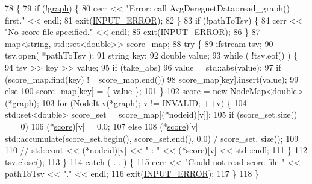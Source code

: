 \begin{DoxyCode}
78                                                               \{
79     \textcolor{keywordflow}{if} (!\hyperlink{classderegnet_1_1DeregnetData_ab76d30fa2ef87099faecb31e3f95b6d6}{graph}) \{
80         cerr << \textcolor{stringliteral}{"Error: call AvgDeregnetData::read\_graph() first."} << endl;
81         exit(\hyperlink{DeregnetData_8h_a288116f92845fddefeb044f5b84bc889}{INPUT\_ERROR});
82     \}
83     \textcolor{keywordflow}{if} (!pathToTsv) \{
84         cerr << \textcolor{stringliteral}{"No score file specified."} << endl;
85         exit(\hyperlink{DeregnetData_8h_a288116f92845fddefeb044f5b84bc889}{INPUT\_ERROR});
86     \}
87     map<string, std::set<double>> score\_map;
88     \textcolor{keywordflow}{try} \{
89         ifstream tsv;
90         tsv.open( *pathToTsv );
91         \textcolor{keywordtype}{string} key;
92         \textcolor{keywordtype}{double} value;
93         \textcolor{keywordflow}{while} ( !tsv.eof() ) \{
94               tsv >> key >> value;
95               \textcolor{keywordflow}{if} (take\_abs)
96                   value = std::abs(value);
97               \textcolor{keywordflow}{if} (score\_map.find(key) != score\_map.end())
98                   score\_map[key].insert(value);
99               \textcolor{keywordflow}{else}
100                   score\_map[key] = \{ value \};        
101         \}
102         \hyperlink{classderegnet_1_1DeregnetData_a32970c8f43eb8be313ad08d829223b1f}{score} = \textcolor{keyword}{new} NodeMap<double>(*graph);
103         \textcolor{keywordflow}{for} (\hyperlink{namespacederegnet_ac34314e1b5f456fc6d1bb9d96316de4a}{NodeIt} v(*graph); v != \hyperlink{usinglemon_8h_adf770fe2eec438e3758ffe905dbae208}{INVALID}; ++v) \{
104             std::set<double> score\_set = score\_map[(*nodeid)[v]];
105             \textcolor{keywordflow}{if} (score\_set.size() == 0)
106                 (*\hyperlink{classderegnet_1_1DeregnetData_a32970c8f43eb8be313ad08d829223b1f}{score})[v] = 0.0;
107             \textcolor{keywordflow}{else}
108                 (*\hyperlink{classderegnet_1_1DeregnetData_a32970c8f43eb8be313ad08d829223b1f}{score})[v] = std::accumulate(score\_set.begin(), score\_set.end(), 0.0) / score\_set.
      size();
109                 
110 \textcolor{comment}{//            std::cout << (*nodeid)[v] << " : " << (*score)[v] << std::endl;}
111         \}
112         tsv.close();
113     \}
114     \textcolor{keywordflow}{catch} ( ... ) \{
115       cerr << \textcolor{stringliteral}{"Could not read score file "} << pathToTsv << \textcolor{stringliteral}{"."} << endl;
116       exit(\hyperlink{DeregnetData_8h_a288116f92845fddefeb044f5b84bc889}{INPUT\_ERROR});
117     \}
118 \}
\end{DoxyCode}


